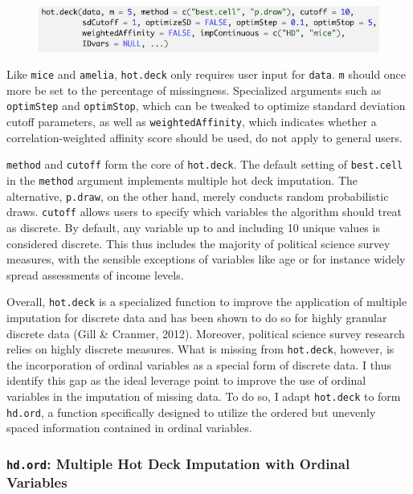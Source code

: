 \documentclass[12pt,econ]{sources/authesis}
\makeatletter
\def\maxwidth{\ifdim\Gin@nat@width>\linewidth\linewidth
\else\Gin@nat@width\fi}
\let\Oldincludegraphics\includegraphics
\renewcommand{\includegraphics}[1]{\Oldincludegraphics[width=\maxwidth]{#1}}
\def\caption{\refstepcounter\@captype \@dblarg{\@caption\@captype}}
\makeatother
\begin{document}
\vspace{0.5cm}
\begin{figure}[!htbp] 
  \centering
  \includegraphics{figures/hot.deck.png}
  \caption{The \texttt{hot.deck} Function}
  \label{hot.deck-func}
\end{figure}
\vspace{-0.5cm}

Like \texttt{mice} and \texttt{amelia}, \texttt{hot.deck} only requires user input for \texttt{data}. \texttt{m} should once more be set to the percentage of missingness. Specialized arguments such as \texttt{optimStep} and \texttt{optimStop}, which can be tweaked to optimize standard deviation cutoff parameters, as well as \texttt{weightedAffinity}, which indicates whether a correlation-weighted affinity score should be used, do not apply to general users.

\texttt{method} and \texttt{cutoff} form the core of \texttt{hot.deck}. The default setting of \texttt{best.cell} in the \texttt{method} argument implements multiple hot deck imputation. The alternative, \texttt{p.draw}, on the other hand, merely conducts random probabilistic draws. \texttt{cutoff} allows users to specify which variables the algorithm should treat as discrete. By default, any variable up to and including 10 unique values is considered discrete. This thus includes the majority of political science survey measures, with the sensible exceptions of variables like age or for instance widely spread assessments of income levels.

Overall, \texttt{hot.deck} is a specialized function to improve the application of multiple imputation for discrete data and has been shown to do so for highly granular discrete data (Gill \& Cranmer, 2012). Moreover, political science survey research relies on highly discrete measures. What is missing from \texttt{hot.deck}, however, is the incorporation of ordinal variables as a special form of discrete data. I thus identify this gap as the ideal leverage point to improve the use of ordinal variables in the imputation of missing data. To do so, I adapt \texttt{hot.deck} to form \texttt{hd.ord}, a function specifically designed to utilize the ordered but unevenly spaced information contained in ordinal variables.

\hypertarget{ordmiss-theory-multimpute-hdord}{%
\subsubsection{\texorpdfstring{\texttt{hd.ord}: Multiple Hot Deck Imputation with Ordinal Variables}{hd.ord: Multiple Hot Deck Imputation with Ordinal Variables}}\label{ordmiss-theory-multimpute-hdord}}
\end{document}
